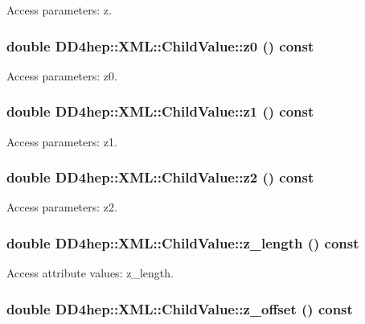 Access parameters: z. \hypertarget{struct_d_d4hep_1_1_x_m_l_1_1_child_value_afba829246b597d2d2204db27c475bf3d}{
\subsubsection[{z0}]{\setlength{\rightskip}{0pt plus 5cm}double DD4hep::XML::ChildValue::z0 () const}}
\label{struct_d_d4hep_1_1_x_m_l_1_1_child_value_afba829246b597d2d2204db27c475bf3d}


Access parameters: z0. \hypertarget{struct_d_d4hep_1_1_x_m_l_1_1_child_value_ae5f97575617ff0d84d4c1cce01f94d31}{
\subsubsection[{z1}]{\setlength{\rightskip}{0pt plus 5cm}double DD4hep::XML::ChildValue::z1 () const}}
\label{struct_d_d4hep_1_1_x_m_l_1_1_child_value_ae5f97575617ff0d84d4c1cce01f94d31}


Access parameters: z1. \hypertarget{struct_d_d4hep_1_1_x_m_l_1_1_child_value_ad6b054e5829702c9bf90f8bcafea74dd}{
\subsubsection[{z2}]{\setlength{\rightskip}{0pt plus 5cm}double DD4hep::XML::ChildValue::z2 () const}}
\label{struct_d_d4hep_1_1_x_m_l_1_1_child_value_ad6b054e5829702c9bf90f8bcafea74dd}


Access parameters: z2. \hypertarget{struct_d_d4hep_1_1_x_m_l_1_1_child_value_a52c87e64bf5684d97244f9eb7857308f}{
\subsubsection[{z\_\-length}]{\setlength{\rightskip}{0pt plus 5cm}double DD4hep::XML::ChildValue::z\_\-length () const}}
\label{struct_d_d4hep_1_1_x_m_l_1_1_child_value_a52c87e64bf5684d97244f9eb7857308f}


Access attribute values: z\_\-length. \hypertarget{struct_d_d4hep_1_1_x_m_l_1_1_child_value_a69106e2cc99679b1163d53be3cdef46c}{
\subsubsection[{z\_\-offset}]{\setlength{\rightskip}{0pt plus 5cm}double DD4hep::XML::ChildValue::z\_\-offset () const}}
\label{struct_d_d4hep_1_1_x_m_l_1_1_child_value_a69106e2cc99679b1163d53be3cdef46c}


